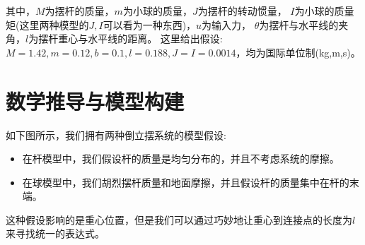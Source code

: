 \documentclass{article}
\begin{document}
其中，$M$为摆杆的质量，$m$为小球的质量，$J$为摆杆的转动惯量，
$I$为小球的质量矩(这里两种模型的$J,I$可以看为一种东西)，$u$为输入力，
$\theta$为摆杆与水平线的夹角，$l$为摆杆重心与水平线的距离。
这里给出假设: $M=1.42,m=0.12,b=0.1,l=0.188,J=I=0.0014$，均为国际单位制(kg,m,s)。
\section*{数学推导与模型构建}
如下图所示，我们拥有两种倒立摆系统的模型假设:
\begin{itemize}
    \item 在杆模型中，我们假设杆的质量是均匀分布的，并且不考虑系统的摩擦。
    \item 在球模型中，我们胡烈摆杆质量和地面摩擦，并且假设杆的质量集中在杆的末端。
\end{itemize}
这种假设影响的是重心位置，但是我们可以通过巧妙地让重心到连接点的长度为$l$来寻找统一的表达式。
\end{document}
